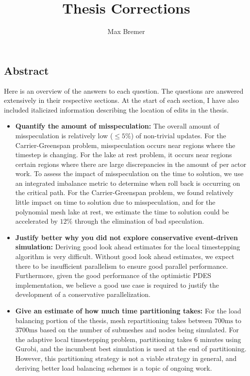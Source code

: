 \documentclass[10pt,letterpaper]{article}
\title{Thesis Corrections}
\author{Max Bremer}
\begin{document}
\maketitle

\subsection*{Abstract}
Here is an overview of the answers to each question. The questions are answered extensively in their respective sections. At the start of each section, I have also included italicized information describing the location of edits in the thesis.
\begin{itemize}
\item {\bf Quantify the amount of misspeculation:} The overall amount of misspeculation is relatively low ($\le 5\%$) of non-trivial updates. For the Carrier-Greenspan problem, misspeculation occurs near regions where the timestep is changing. For the lake at rest problem, it occurs near regions certain regions where there are large discrepancies in the amount of per actor work. To assess the impact of misspeculation on the time to solution, we use an integrated imbalance metric to determine when roll back is occurring on the critical path. For the Carrier-Greenspan problem, we found relatively  little impact on time to solution due to misspeculation, and for the polynomial mesh lake at rest, we estimate the time to solution could be accelerated by $12\%$ through the elimination of bad speculation.
\item {\bf Justify better why you did not explore conservative event-driven simulation:} Deriving good look ahead estimates for the local timestepping algorithm is very difficult. Without good look ahead estimates, we expect there to be insufficient parallelism to ensure good parallel performance. Furthermore, given the good performance of the optimistic PDES implementation, we believe a good use case is required to justify the development of a conservative parallelization.
\item {\bf Give an estimate of how much time partitioning takes:} For the load balancing portion of the thesis, mesh repartitioning takes between $700 \mathrm{ms}$ to $3700 \mathrm{ms}$ based on the number of submeshes and nodes being simulated. For the adaptive local timestepping problem, partitioning takes 6 minutes using Gurobi, and the incumbent best simulation is used at the end of partitioning. However, this partitioning strategy is not a viable strategy in general, and deriving better load balancing schemes is a topic of ongoing work.
\end{itemize}
\end{document}
